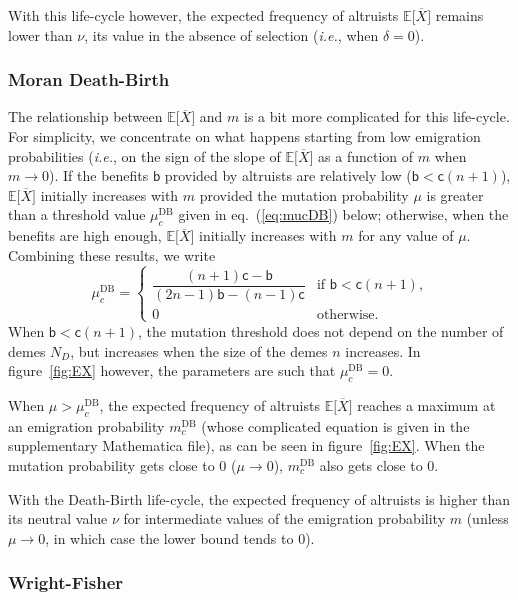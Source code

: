 \documentclass[11pt, letterpaper]{article}
\renewcommand{\eqref}[1]{\textup{{\normalfont eq.~(\ref{#1}}\normalfont)}}
\newcommand{\ie}{\textit{i.e.}}
\newcommand{\Esp}[1]{\mathbb{E}\big[ #1\big]}%
\newcommand{\bb}{\mathsf{b}}
\newcommand{\cc}{\mathsf{c}}
\newcommand{\DB}{\textrm{DB}}
\newcommand{\ndemes}{N_D}
\newcommand{\selstr}{\delta}
\begin{document}
With this life-cycle however, the expected frequency of altruists $\Esp{\overline{X}}$ remains lower than $\nu$, its value in the absence of selection (\ie, when $\selstr =0$). 

\subsubsection{Moran Death-Birth}

The relationship between $\Esp{\overline{X}}$ and $m$ is a bit more complicated for this life-cycle. For simplicity, we concentrate on what happens starting from low emigration probabilities (\ie, on the sign of the slope of $\Esp{\overline{X}}$ as a function of $m$ when $m\to 0$). If the benefits $\bb$ provided by altruists are relatively low ($\bb < \cc (n+1)$), $\Esp{\overline{X}}$ initially increases with $m$ provided the mutation probability $\mu$ is greater than a threshold value $\mu_c^{\DB}$ given in \eqref{eq:mucDB} below; otherwise, when the benefits are high enough, $\Esp{\overline{X}}$ initially increases with $m$ for any value of $\mu$. Combining these results, we write
\begin{equation}\label{eq:mucDB}
\mu_c^{\DB} = \begin{cases}
\dfrac{ (n+1) \cc - \bb}{ (2 n - 1) \bb - (n-1) \cc} & \textrm{if $\bb < \cc (n+1)$,} \\
%
0 & \textrm{otherwise. }
\end{cases}
\end{equation} 
%
When $\bb < \cc (n+1)$, the mutation threshold does not depend on the number of demes $\ndemes$, but increases when the size of the demes $n$ increases. In figure~\ref{fig:EX} however, the parameters are such that $\mu_c^{\DB} = 0$. 

When $\mu > \mu_c^{\DB}$, the expected frequency of altruists $\Esp{\overline{X}}$ reaches a maximum at an emigration probability $m_c^{\DB}$ (whose complicated equation is given in the supplementary Mathematica file), as can be seen in figure~\ref{fig:EX}. When the mutation probability gets close to $0$ ($\mu \to 0$), $m_c^{\DB}$ also gets close to $0$.

With the Death-Birth life-cycle, the expected frequency of altruists is higher than its neutral value $\nu$ for intermediate values of the emigration probability $m$ (unless $\mu \to 0$, in which case the lower bound tends to $0$).

\subsubsection{Wright-Fisher}
\end{document}
